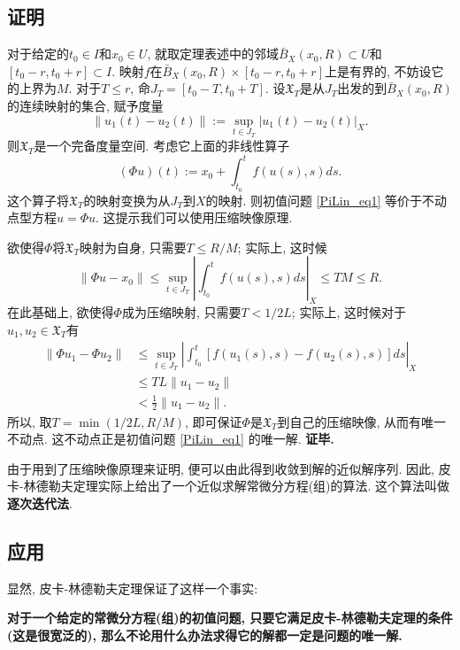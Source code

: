 \subsection{证明}
对于给定的$t_0\in I$和$x_0\in U$, 就取定理表述中的邻域$\bar B_X(x_0,R)\subset U$和$[t_0-r,t_0+r]\subset I$. 映射$f$在$\bar B_X(x_0,R)\times[t_0-r,t_0+r]$上是有界的, 不妨设它的上界为$M$. 对于$T\leq r$, 命$J_T=[t_0-T,t_0+T]$. 设$\mathfrak{X}_T$是从$J_T$出发的到$\bar B_X(x_0,R)$的连续映射的集合, 赋予度量
$$
\|u_1(t)-u_2(t)\|:=\sup_{t\in J_T}|u_1(t)-u_2(t)|_X.
$$
则$\mathfrak{X}_T$是一个完备度量空间. 考虑它上面的非线性算子
$$
(\Phi u)(t):=x_0+\int_{t_0}^tf(u(s),s)ds.
$$ 
这个算子将$\mathfrak{X}_T$的映射变换为从$J_T$到$X$的映射. 则初值问题 \autoref{PiLin_eq1} 等价于不动点型方程$u=\Phi u$. 这提示我们可以使用压缩映像原理.

欲使得$\Phi$将$\mathfrak{X}_T$映射为自身, 只需要$T\leq R/M$; 实际上, 这时候
$$
\|\Phi u-x_0\|
\leq\sup_{t\in J_T}\left|\int_{t_0}^tf(u(s),s)ds\right|_X
\leq TM\leq R.
$$
在此基础上, 欲使得$\Phi$成为压缩映射, 只需要$T<1/2L$; 实际上, 这时候对于$u_1,u_2\in\mathfrak{X}_T$有
$$
\begin{aligned}
\|\Phi u_1-\Phi u_2\|
&\leq\sup_{t\in J_T}\left|\int_{t_0}^t[f(u_1(s),s)-f(u_2(s),s)]ds\right|_X \\
&\leq TL\|u_1-u_2\|\\
&<\frac{1}{2}\|u_1-u_2\|.
\end{aligned}
$$
所以, 取$T=\min\left(1/2L,R/M\right)$, 即可保证$\Phi$是$\mathfrak{X}_T$到自己的压缩映像, 从而有唯一不动点. 这不动点正是初值问题 \autoref{PiLin_eq1} 的唯一解. \textbf{证毕.}

由于用到了压缩映像原理来证明, 便可以由此得到收敛到解的近似解序列. 因此, 皮卡-林德勒夫定理实际上给出了一个近似求解常微分方程(组)的算法. 这个算法叫做\textbf{逐次迭代法}.

\subsection{应用}
显然, 皮卡-林德勒夫定理保证了这样一个事实: 

\textbf{对于一个给定的常微分方程(组)的初值问题, 只要它满足皮卡-林德勒夫定理的条件(这是很宽泛的), 那么不论用什么办法求得它的解都一定是问题的唯一解.}